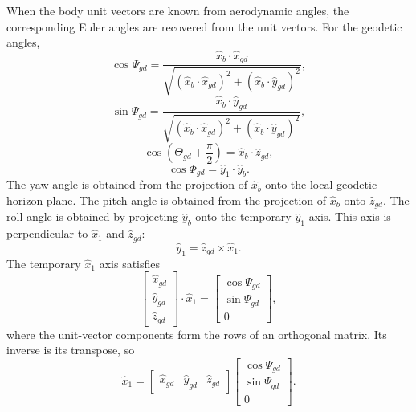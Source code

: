 When the body unit vectors are known from aerodynamic angles, the corresponding
Euler angles are recovered from the unit vectors. For the geodetic angles,
\begin{equation}
  \cos\Psi_{gd}
  = \frac{\hat{x}_b\mathbin{\cdot}\hat{x}_{gd}}
  {\sqrt{(\hat{x}_b\mathbin{\cdot}\hat{x}_{gd})^2
       +(\hat{x}_b\mathbin{\cdot}\hat{y}_{gd})^2}},
  \label{eq:geodetic-yaw-cosine}
\end{equation}
\begin{equation}
  \sin\Psi_{gd}
  = \frac{\hat{x}_b\mathbin{\cdot}\hat{y}_{gd}}
  {\sqrt{(\hat{x}_b\mathbin{\cdot}\hat{x}_{gd})^2
       +(\hat{x}_b\mathbin{\cdot}\hat{y}_{gd})^2}},
  \label{eq:geodetic-yaw-sine}
\end{equation}
\begin{equation}
  \cos\left(\Theta_{gd}+\frac{\pi}{2}\right)
  = \hat{x}_b\mathbin{\cdot}\hat{z}_{gd},
  \label{eq:geodetic-pitch-from-body-axis}
\end{equation}
\begin{equation}
  \cos\Phi_{gd}=\hat{y}_1\mathbin{\cdot}\hat{y}_b.
  \label{eq:geodetic-roll-from-body-axis}
\end{equation}
The yaw angle is obtained from the projection of $\hat{x}_b$ onto the local
geodetic horizon plane. The pitch angle is obtained from the projection of
$\hat{x}_b$ onto $\hat{z}_{gd}$. The roll angle is obtained by projecting
$\hat{y}_b$ onto the temporary $\hat{y}_1$ axis. This axis is perpendicular to
$\hat{x}_1$ and $\hat{z}_{gd}$:
\begin{equation}
  \hat{y}_1=\hat{z}_{gd}\times\hat{x}_1.
  \label{eq:temporary-yaw-y-axis}
\end{equation}
The temporary $\hat{x}_1$ axis satisfies
\begin{equation}
  \begin{bmatrix}
    \hat{x}_{gd}\\[0.2em]
    \hat{y}_{gd}\\[0.2em]
    \hat{z}_{gd}
  \end{bmatrix}
  \mathbin{\cdot}\hat{x}_1
  =
  \begin{bmatrix}
    \cos\Psi_{gd}\\[0.2em]
    \sin\Psi_{gd}\\[0.2em]
    0
  \end{bmatrix},
  \label{eq:temporary-yaw-x-linear-system}
\end{equation}
where the unit-vector components form the rows of an orthogonal matrix. Its inverse
is its transpose, so
\begin{equation}
  \hat{x}_1
  =
  \begin{bmatrix}
    \hat{x}_{gd}&\hat{y}_{gd}&\hat{z}_{gd}
  \end{bmatrix}
  \begin{bmatrix}
    \cos\Psi_{gd}\\[0.2em]
    \sin\Psi_{gd}\\[0.2em]
    0
  \end{bmatrix}.
  \label{eq:temporary-yaw-x-axis}
\end{equation}
